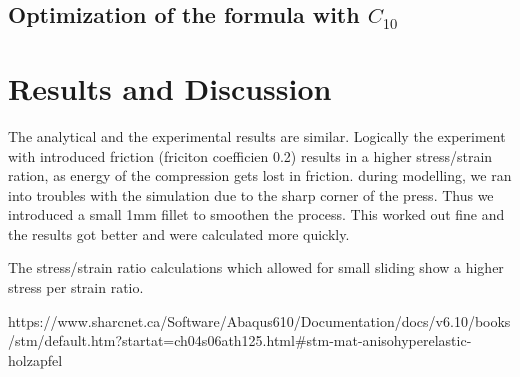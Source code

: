 \documentclass[12pt]{article}
\begin{document}
\subsection{Optimization of the formula with $C_{10}$}






\pagebreak
\section{Results and Discussion}

The analytical and the experimental results are similar.
Logically the experiment with introduced friction (friciton coefficien 0.2) results in a higher
stress/strain ration, as energy of the compression gets lost in friction. 
during modelling, we ran into troubles with the simulation due to the sharp corner of the press.
Thus we introduced a small 1mm fillet to smoothen the process. This worked out fine and the results 
got better and were calculated more quickly.

The stress/strain ratio calculations which allowed for small sliding show a higher stress per strain ratio.


\pagebreak
\begin{thebibliography}{9}
  https://www.sharcnet.ca/Software/Abaqus610/Documentation/docs/v6.10/books/stm/default.htm?startat=ch04s06ath125.html\#stm-mat-anisohyperelastic-holzapfel
\end{thebibliography}
\end{document}
